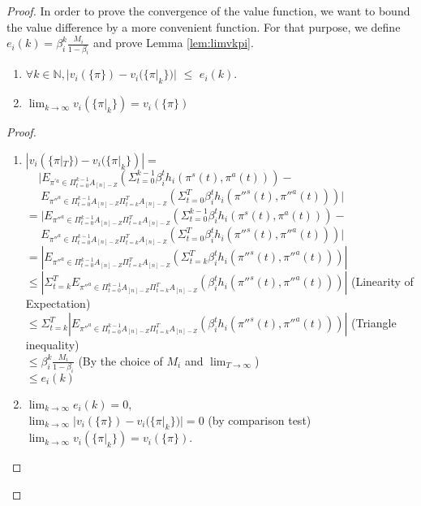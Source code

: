 \begin{proof}
In order to prove the convergence of the value function, we want to bound the value difference by a more convenient function. For that purpose, we define $e_i(k)=\beta_i^{k}\frac{M_i}{1-\beta_i}$ and prove Lemma \ref{lem:limvkpi}.
\setcounter{lemma}{0}
\begin{lemma}\label{lem:limvkpi}
	\begin{enumerate}
		\item $\forall k\in \mathbb{N}, |v_i(\{\pi\})-v_i(\{\pi|_k\})|$ $\le$ $e_i(k)$.	
		\item $\lim_{k\to\infty}  v_i(\{\pi|_k\})=v_i(\{\pi\})$
	\end{enumerate}
\end{lemma}

\begin{proof}
	\begin{enumerate}
		\item 	$|v_i(\{\pi|_T\})-v_i(\{\pi|_k\})| =$\\
		$~~~~~| E_{\pi^{'a} \in \Pi_{t=0}^{k-1} A_{[n]-Z}}(\Sigma_{t=0}^{k-1} \beta_i^{t}h_{i}(\pi^{s}(t),\pi^{a}(t))) -$\\
		$~~~~~~ E_{\pi''^{a} \in \Pi_{t=0}^{k-1} A_{[n]-Z} \Pi_{t=k}^{T} A_{[n]-Z}}(\Sigma_{t=0}^{T} \beta_i^{t}h_{i}(\pi''^{s}(t),\pi''^{a}(t)))|$\\
		$=| E_{\pi''^{a} \in \Pi_{t=0}^{k-1} A_{[n]-Z} \Pi_{t=k}^{T} A_{[n]-Z}}(\Sigma_{t=0}^{k-1} \beta_i^{t}h_{i}(\pi^{s}(t),\pi^{a}(t)))-$\\
		$~~~~~~ E_{\pi''^{a} \in \Pi_{t=0}^{k-1} A_{[n]-Z} \Pi_{t=k}^{T} A_{[n]-Z}}(\Sigma_{t=0}^{T} \beta_i^{t}h_{i}(\pi''^{s}(t),\pi''^{a}(t)))|$\\
		$ =|E_{\pi''^{a} \in \Pi_{t=0}^{k-1} A_{[n]-Z} \Pi_{t=k}^{T} A_{[n]-Z}}(\Sigma_{t=k}^{T} \beta_i^{t}h_{i}(\pi''^{s}(t),\pi''^{a}(t)))|$\\
		$\leq |\Sigma_{t=k}^{T} E_{\pi''^{a} \in \Pi_{t=0}^{k-1} A_{[n]-Z} \Pi_{t=k}^{T} A_{[n]-Z}}( \beta_i^{t}h_{i}(\pi''^{s}(t),\pi''^{a}(t)))| $ (Linearity of Expectation)\\
		$\leq \Sigma_{t=k}^{T}| E_{\pi''^{a} \in \Pi_{t=0}^{k-1} A_{[n]-Z} \Pi_{t=k}^{T} A_{[n]-Z}}( \beta_i^{t}h_{i}(\pi''^{s}(t),\pi''^{a}(t)))| $ (Triangle inequality)\\
		$\le \beta_i^{k}\frac{M_i}{1-\beta_i}$ (By the choice of $M_i$ and $\lim_{T\to\infty}$)\\
		$\leq e_i(k)$
		\item $\lim_{k\to\infty} e_i(k)=0$,\\
		$\lim_{k\to\infty} |v_i(\{\pi\})-v_i(\{\pi|_k\})| = 0$ (by comparison test)\\
		$\lim_{k\to\infty} v_i(\{\pi|_k\})=v_i(\{\pi\})$.
	\end{enumerate}
\end{proof}



\end{proof}

